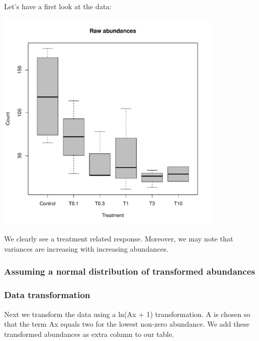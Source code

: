   
Let's have a first look at the data:
\begin{knitrout}
\color{fgcolor}\small\begin{kframe}
\begin{alltt}
 \hlopt{~}     \hlstd{=} \hlstd{,}
             \hlstd{=} \hlstd{,}  \hlstd{=} \hlstd{,}  \hlstd{=} \hlstd{)}
\end{alltt}
\end{kframe}

{\centering \includegraphics[width=0.8\textwidth]{appendix/usetheglm/two/count_raw_plot-1} 

}



\end{knitrout}
We clearly see a treatment related response. 
Moreover, we may note that variances are increasing with increasing abundances.



\subsubsection{Assuming a normal distribution of transformed abundances}
\subsubsection{Data transformation}
Next we transform the data using a ln(Ax + 1) transformation.
A is chosen so that the term Ax equals two for the lowest non-zero abundance.
We add these transformed abundances as extra column to our table.

